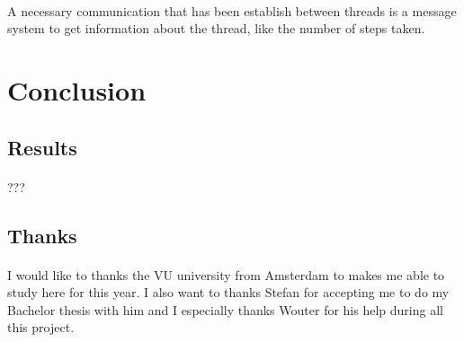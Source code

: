 \documentclass{article}
\begin{document}
		\paragraph{}
			A necessary communication that has been establish between threads is a message system to get information about the thread,
			like the number of steps taken.

\newpage
\section{Conclusion}
	\subsection{Results}
		\paragraph{}
			???
	\subsection{Thanks}
		\paragraph{}
			I would like to thanks the VU university from Amsterdam to makes me able to study here for this year.
			I also want to thanks Stefan for accepting me to do my Bachelor thesis with him
			and I especially thanks Wouter for his help during all this project.

\newpage


\end{document}
